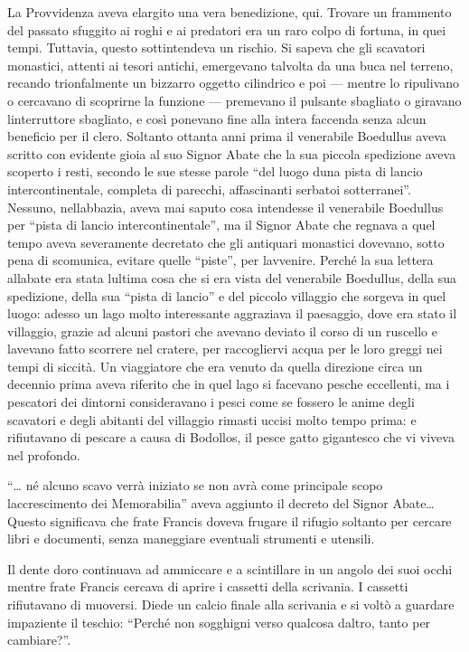 La Provvidenza aveva elargito una vera benedizione, qui. Trovare un
frammento del passato sfuggito ai roghi e ai predatori era un raro colpo
di fortuna, in quei tempi. Tuttavia, questo sottintendeva un rischio. Si
sapeva che gli scavatori monastici, attenti ai tesori antichi,
emergevano talvolta da una buca nel terreno, recando trionfalmente un
bizzarro oggetto cilindrico e poi --- mentre lo ripulivano o cercavano
di scoprirne la funzione --- premevano il pulsante sbagliato o giravano
l\textquotesingle interruttore sbagliato, e così ponevano fine alla
intera faccenda senza alcun beneficio per il clero. Soltanto ottanta
anni prima il venerabile Boedullus aveva scritto con evidente gioia al
suo Signor Abate che la sua piccola spedizione aveva scoperto i resti,
secondo le sue stesse parole ``del luogo d\textquotesingle una pista di
lancio intercontinentale, completa di parecchi, affascinanti serbatoi
sotterranei''. Nessuno, nell\textquotesingle abbazia, aveva mai saputo
cosa intendesse il venerabile Boedullus per ``pista di lancio
intercontinentale'', ma il Signor Abate che regnava a quel tempo aveva
severamente decretato che gli antiquari monastici dovevano, sotto pena
di scomunica, evitare quelle ``piste'', per l\textquotesingle avvenire.
Perché la sua lettera all\textquotesingle abate era stata
l\textquotesingle ultima cosa che si era vista del venerabile Boedullus,
della sua spedizione, della sua ``pista di lancio'' e del piccolo
villaggio che sorgeva in quel luogo: adesso un lago molto interessante
aggraziava il paesaggio, dove era stato il villaggio, grazie ad alcuni
pastori che avevano deviato il corso di un ruscello e
l\textquotesingle avevano fatto scorrere nel cratere, per raccogliervi
acqua per le loro greggi nei tempi di siccità. Un viaggiatore che era
venuto da quella direzione circa un decennio prima aveva riferito che in
quel lago si facevano pesche eccellenti, ma i pescatori dei dintorni
consideravano i pesci come se fossero le anime degli scavatori e degli
abitanti del villaggio rimasti uccisi molto tempo prima: e rifiutavano
di pescare a causa di Bo\textquotesingle dollos, il pesce gatto
gigantesco che vi viveva nel profondo.

``\ldots{} né alcuno scavo verrà iniziato se non avrà come principale
scopo l\textquotesingle accrescimento dei Memorabilia'' aveva aggiunto
il decreto del Signor Abate\ldots{} Questo significava che frate Francis
doveva frugare il rifugio soltanto per cercare libri e documenti, senza
maneggiare eventuali strumenti e utensili.

Il dente d\textquotesingle oro continuava ad ammiccare e a scintillare
in un angolo dei suoi occhi mentre frate Francis cercava di aprire i
cassetti della scrivania. I cassetti rifiutavano di muoversi. Diede un
calcio finale alla scrivania e si voltò a guardare impaziente il
teschio: ``Perché non sogghigni verso qualcosa d\textquotesingle altro,
tanto per cambiare?''.

